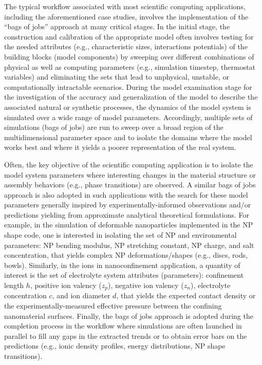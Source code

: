 The typical workflow associated with most scientific computing applications, including the aforementioned case studies, involves the implementation of the ``bags of jobs'' approach at many critical stages. In the initial stage, the construction and calibration of the appropriate model often involves testing for the needed attributes (e.g., characteristic sizes, interactions potentials) of the building blocks (model components) by sweeping over different combinations of physical as well as computing parameters (e.g., simulation timestep, thermostat variables) and eliminating the sets that lead to unphysical, unstable, or computationally intractable scenarios. During the model examination stage for the investigation of the accuracy and generalization of the model to describe the associated natural or synthetic processes, the dynamics of the model system is simulated over a wide range of model parameters. Accordingly, multiple sets of simulations (bags of jobs) are run to sweep over a broad region of the multidimensional parameter space and to isolate the domains where the model works best and where it yields a poorer representation of the real system. 

Often, the key objective of the scientific computing application is to isolate the model system parameters where interesting changes in the material structure or assembly behaviors (e.g., phase transitions) are observed. A similar bags of jobs approach is also  adopted in such applications with the search for these model parameters generally inspired by experimentally-informed observations and/or predictions yielding from approximate analytical theoretical formulations. For example, in the simulation of deformable nanoparticles implemented in the NP shape code, one is interested in isolating the set of NP and environmental parameters: NP bending modulus, NP stretching constant, NP charge, and salt concentration, that yields complex NP deformations/shapes (e.g., discs, rods, bowls). Similarly, in the ions in nanoconfinement application, a quantity of interest is the set of electrolyte system attributes (parameters): confinement length $h$, positive ion valency ($z_p$), negative ion valency ($z_n$), electrolyte concentration $c$, and ion diameter $d$, that yields the expected contact density or the experimentally-measured effective pressure between the confining nanomaterial surfaces. Finally, the bags of jobs approach is adopted during the completion process in the workflow where simulations are often launched in parallel to fill any gaps in the extracted trends or to obtain error bars on the predictions (e.g., ionic density profiles, energy distributions, NP shape transitions).

